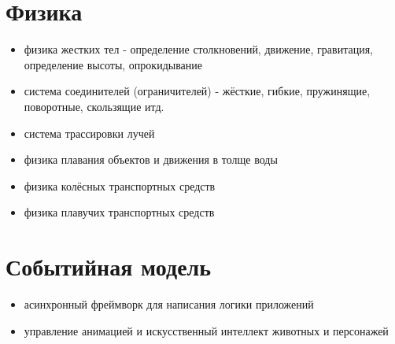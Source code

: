 \documentclass[a4paper,12pt,oneside]{sphinxmanual}
\begin{document}
\section{Физика}
\label{features:id12}\begin{itemize}
\item {} 
физика жестких тел - определение столкновений, движение, гравитация, определение высоты, опрокидывание

\item {} 
система соединителей (ограничителей) - жёсткие, гибкие, пружинящие, поворотные, скользящие итд.

\item {} 
система трассировки лучей

\item {} 
физика плавания объектов и движения в толще воды

\item {} 
физика колёсных транспортных средств

\item {} 
физика плавучих транспортных средств

\end{itemize}


\section{Событийная модель}
\label{features:id13}\begin{itemize}
\item {} 
асинхронный фреймворк для написания логики приложений

\item {} 
управление анимацией и искусственный интеллект животных и персонажей

\end{itemize}
\end{document}
